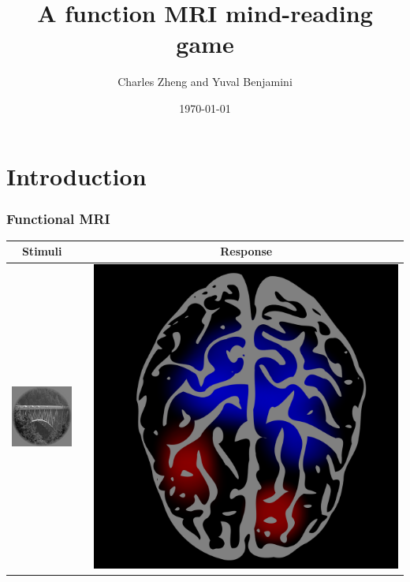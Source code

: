 \documentclass{beamer}
\title[Group talk]{A function MRI mind-reading game}
\author{Charles Zheng and Yuval Benjamini} %
\institute[Stanford] %
{Stanford University}
\date{\today} %
\begin{document}
\begin{frame}
\titlepage %
\end{frame}

\section{Introduction}

\frame{\sectionpage}

\begin{frame}
\frametitle{Functional MRI}
\begin{center}
\begin{tabular}{ccc}
\hline
Stimuli & & Response\\ \hline
\includegraphics[scale = .52]{img1.png} & \hspace{1in} & \includegraphics[scale = 0.07]{brain1.png} \\ \hline

\end{tabular}
\end{center}
\end{frame}
\end{document}
